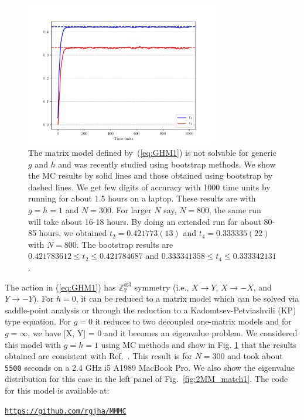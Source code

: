 \documentclass[letter,11pt]{article}
\begin{document}
\begin{figure}[htbp] 
	\centering 
	\includegraphics[width=0.75\textwidth]{figs/plot_2MM_sym1.pdf}
	\caption{\label{fig:2MM_match}The matrix model defined by~(\ref{eq:GHM1}) is not solvable for generic $g$ and $h$ and was recently studied using bootstrap methods. We show the MC results by solid lines and those obtained using bootstrap by dashed lines. We get few digits of accuracy with 1000 time units by running for about 1.5 hours on a laptop. These results are with $g=h=1$ and $N=300$. For larger $N$ say, $N=800$, the same run will take about 16-18 hours. By doing an extended run for about 80-85 hours, we obtained $t_{2} = 0.421773(13) $ and $t_{4}=0.333335(22)$ with $N=800$. The bootstrap results are $0.421783612 \le t_{2} \le 0.421784687$ and $0.333341358 \le t_{4} \le 0.333342131$ \cite{Kazakov:2021lel}.}
\end{figure} 

The action in (\ref{eq:GHM1}) has $\mathbb{Z}_{2}^{\otimes 3}$ symmetry 
(i.e., $X \to Y$, $X \to -X$, and $Y \to -Y$). For $h = 0$, it can be reduced to a
matrix model which can be solved via saddle-point analysis or through the reduction 
to a Kadomtsev-Petviashvili (KP) type equation. 
For $g = 0$ it reduces to two decoupled one-matrix models 
and for $g = \infty$, we have [X, Y] = 0 and it becomes an eigenvalue problem. 
We considered this model with $g=h=1$ using MC methods and show in Fig. \ref{fig:2MM_match} that the results obtained are consistent with Ref.~\cite{Kazakov:2021lel}. 
This result is for $N = 300$ and took about \texttt{5500} seconds on a 2.4 GHz i5 A1989 MacBook Pro. We also show the eigenvalue distribution for this case in the left panel of Fig.~\ref{fig:2MM_match1}. The code for this model is available at:  
\begin{center} 
	\texttt{\href{https://github.com/rgjha/MMMC}{https://github.com/rgjha/MMMC}}
 \end{center}
\end{document}
